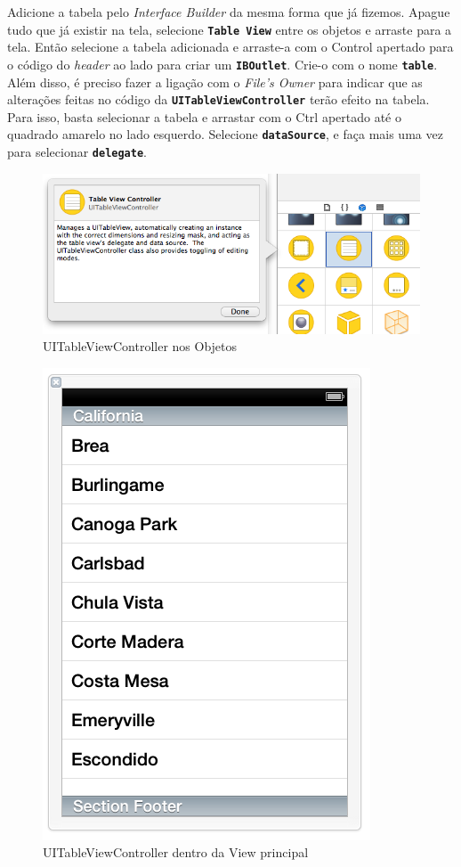 \documentclass[a4paper,12pt,brazil,doubleside]{book}
\begin{document}
\begin{singlespace}
Adicione a tabela pelo \emph{Interface Builder} da mesma forma que já fizemos. Apague tudo que já existir na tela, selecione \texttt{\textbf{Table View}} entre os objetos e arraste para a tela. Então selecione a tabela adicionada e arraste-a com o Control apertado para o código do \emph{header} ao lado para criar um \texttt{\textbf{IBOutlet}}. Crie-o com o nome \texttt{\textbf{table}}. Além disso, é preciso fazer a ligação com o \emph{File's Owner} para indicar que as alterações feitas no código da \texttt{\textbf{UITableViewController}} terão efeito na tabela. Para isso, basta selecionar a tabela e arrastar com o Ctrl apertado até o quadrado amarelo no lado esquerdo. Selecione \texttt{\textbf{dataSource}}, e faça mais uma vez para selecionar \texttt{\textbf{delegate}}.

\begin{figure}[H]
  \centering
  \includegraphics[width=.75\textwidth]{figuras/table/table8.png}
  \caption{UITableViewController nos Objetos}
  \label{fig:a}
\end{figure}

\begin{figure}[H]
  \centering
  \includegraphics[width=.75\textwidth]{figuras/table/table9.png}
  \caption{UITableViewController dentro da View principal}
  \label{fig:a}
\end{figure}


\end{singlespace}
\end{document}
